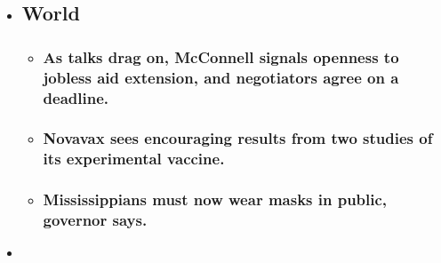 \begin{itemize}
\item
  \href{https://www.nytimes.com/2020/08/04/world/coronavirus-cases.html?type=styln-live-updates\&label=world\&index=0}{}

  \hypertarget{world}{%
  \subsection{World}\label{world}}

  \begin{itemize}
  \item
    \href{https://www.nytimes.com/2020/08/04/world/coronavirus-cases.html?type=styln-live-updates\&label=world\&index=0\#link-762df92}{}

    \hypertarget{as-talks-drag-on-mcconnell-signals-openness-to-jobless-aid-extension-and-negotiators-agree-on-a-deadline}{%
    \subsubsection{As talks drag on, McConnell signals openness to
    jobless aid extension, and negotiators agree on a
    deadline.}\label{as-talks-drag-on-mcconnell-signals-openness-to-jobless-aid-extension-and-negotiators-agree-on-a-deadline}}
  \item
    \href{https://www.nytimes.com/2020/08/04/world/coronavirus-cases.html?type=styln-live-updates\&label=world\&index=0\#link-1228a480}{}

    \hypertarget{novavax-sees-encouraging-results-from-two-studies-of-its-experimental-vaccine}{%
    \subsubsection{Novavax sees encouraging results from two studies of
    its experimental
    vaccine.}\label{novavax-sees-encouraging-results-from-two-studies-of-its-experimental-vaccine}}
  \item
    \href{https://www.nytimes.com/2020/08/04/world/coronavirus-cases.html?type=styln-live-updates\&label=world\&index=0\#link-794484ed}{}

    \hypertarget{mississippians-must-now-wear-masks-in-public-governor-says}{%
    \subsubsection{Mississippians must now wear masks in public,
    governor
    says.}\label{mississippians-must-now-wear-masks-in-public-governor-says}}
  \end{itemize}
\item
  \href{https://www.nytimes.com/live/2020/08/04/business/stock-market-today-coronavirus?type=styln-live-updates\&label=business\&index=1}{}


\end{itemize}
